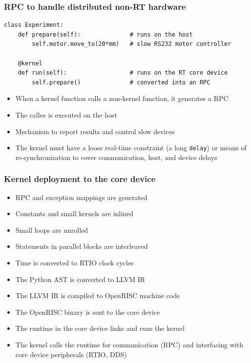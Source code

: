 \documentclass[final,presentation,compress]{beamer}
\begin{document}
\begin{frame}[fragile]
  \frametitle{RPC to handle distributed non-RT hardware}
  \footnotesize

  \begin{verbatim}
class Experiment:
    def prepare(self):              # runs on the host
        self.motor.move_to(20*mm)   # slow RS232 motor controller

    @kernel
    def run(self):                  # runs on the RT core device
        self.prepare()              # converted into an RPC
  \end{verbatim}

  \begin{itemize}
    \item When a kernel function calls a non-kernel function, it generates a RPC
    \item The callee is executed on the host
    \item Mechanism to report results and control slow devices
    \item The kernel must have a loose real-time constraint (a long \verb!delay!)
        or means of re-synchronization to cover communication, host, and device delays
  \end{itemize}
\end{frame}


\begin{frame}
  \frametitle{Kernel deployment to the core device}
  \footnotesize
  \begin{itemize}
    \item RPC and exception mappings are generated
    \item Constants and small kernels are inlined
    \item Small loops are unrolled
    \item Statements in parallel blocks are interleaved
    \item Time is converted to RTIO clock cycles
    \item The Python AST is converted to LLVM IR
    \item The LLVM IR is compiled to OpenRISC machine code
    \item The OpenRISC binary is sent to the core device
    \item The runtime in the core device links and runs the kernel
    \item The kernel calls the runtime for communication (RPC) and interfacing
      with core device peripherals (RTIO, DDS)
  \end{itemize}
\end{frame}
\end{document}
